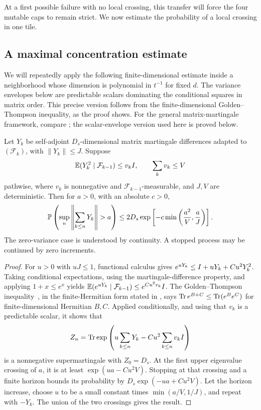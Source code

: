 At a first possible failure with no local crossing, this transfer will
force the four mutable caps to remain strict.  We now estimate the
probability of a local crossing in one tile.

\subsection{A maximal concentration estimate}

We will repeatedly apply the following finite-dimensional estimate
inside a neighborhood whose dimension is polynomial in $t^{-1}$ for
fixed $d$. The variance envelopes below are predictable scalars
dominating the conditional squares in matrix order. This precise
version follows from the finite-dimensional Golden--Thompson
inequality, as the proof shows. For the general matrix-martingale
framework, compare \cite[Theorem~1.2 and Corollary~1.3]{Tropp2011};
the scalar-envelope version used here is proved below.

\begin{lemma}\label{lem:matrix-concentration}
Let $Y_k$ be self-adjoint $D_s$-dimensional matrix martingale differences
adapted to $(\mathcal F_k)$, with $\|Y_k\|\le J$. Suppose
\[
 \mathbb E(Y_k^2\mid\mathcal F_{k-1})\le v_kI,
 \qquad \sum_k v_k\le V
\]
pathwise, where $v_k$ is nonnegative and $\mathcal F_{k-1}$-measurable,
and $J,V$ are deterministic. Then for $a>0$, with an absolute $c>0$,
\[
 \PP\left(\sup_n\left\|\sum_{k\le n}Y_k\right\|>a\right)
 \le2D_s\exp\left[-c\min\left(\frac{a^2}{V},\frac aJ\right)\right].
\]
The zero-variance case is understood by continuity. A stopped process
may be continued by zero increments.
\end{lemma}

\begin{proof}
For $u>0$ with $uJ\le1$, functional calculus gives
$e^{uY_k}\le I+uY_k+Cu^2Y_k^2$. Taking conditional expectations,
using the martingale-difference property, and applying
$1+x\le e^x$ yields
$\mathbb E(e^{uY_k}\mid\mathcal F_{k-1})\le e^{Cu^2v_k}I$.
The Golden--Thompson inequality~\cite{Golden1965,Thompson1965},
in the finite-Hermitian form stated in
\cite[Equation~(1.1)]{ForresterThompson2014}, says
$\operatorname{Tr} e^{B+C}\le\operatorname{Tr}(e^Be^C)$ for
finite-dimensional Hermitian $B,C$. Applied conditionally, and using
that $v_k$ is a predictable scalar, it shows that
\[
 Z_n=\operatorname{Tr}\exp\left(u\sum_{k\le n}Y_k-Cu^2\sum_{k\le n}v_kI\right)
\]
is a nonnegative supermartingale with $Z_0=D_s$.
At the first upper eigenvalue crossing of $a$, it is at least
$\exp(ua-Cu^2V)$. Stopping at that crossing and a finite horizon bounds
its probability by $D_s\exp(-ua+Cu^2V)$. Let the horizon increase, choose
$u$ to be a small constant times $\min(a/V,1/J)$, and repeat with $-Y_k$.
The union of the two crossings gives the result.
\end{proof}

